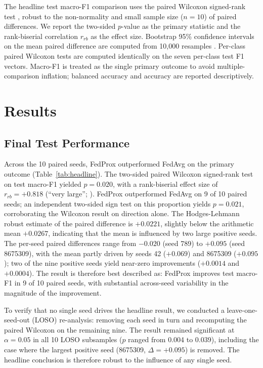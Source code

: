 \documentclass[11pt,a4paper]{article}
\begin{document}
The headline test macro-F1 comparison uses the paired Wilcoxon
signed-rank test \citep{demsar2006classifier}, robust to the non-normality and
small sample size ($n = 10$) of paired differences. We report the
two-sided $p$-value as the primary statistic and the rank-biserial
correlation $r_{rb}$ \citep{kerby2014rankbiserial} as the effect size. Bootstrap
95\% confidence intervals on the mean paired difference are computed
from 10{,}000 resamples \citep{efron1993bootstrap}. Per-class
paired Wilcoxon tests are computed identically on the seven per-class
test F1 vectors. Macro-F1 is treated as the single primary outcome to
avoid multiple-comparison inflation; balanced accuracy and accuracy are
reported descriptively.

\section{Results}

\subsection{Final Test Performance}
Across the 10 paired seeds, FedProx outperformed FedAvg on the primary
outcome (Table~\ref{tab:headline}). The two-sided paired Wilcoxon
signed-rank test on test macro-F1 yielded $p = 0.020$, with a
rank-biserial effect size of $r_{rb} = +0.818$ (``very large'';
\citealt{Kerby, 2014}). FedProx outperformed FedAvg on 9 of 10 paired
seeds; an independent two-sided sign test on this proportion yields
$p = 0.021$, corroborating the Wilcoxon result on direction alone. The
Hodges-Lehmann robust estimate of the paired difference is $+0.0221$,
slightly below the arithmetic mean $+0.0267$, indicating that the mean
is influenced by two large positive seeds. The per-seed paired
differences range from $-0.020$ (seed 789) to $+0.095$ (seed 8675309),
with the mean partly driven by seeds 42 ($+0.069$) and 8675309
($+0.095$); two of the nine positive seeds yield near-zero
improvements ($+0.0014$ and $+0.0004$). The result is therefore best
described as: FedProx improves test macro-F1 in 9 of 10 paired seeds,
with substantial across-seed variability in the magnitude of the
improvement.

To verify that no single seed drives the headline result, we conducted a
leave-one-seed-out (LOSO) re-analysis: removing each seed in turn and
recomputing the paired Wilcoxon on the remaining nine. The result
remained significant at $\alpha = 0.05$ in all 10 LOSO subsamples
($p$ ranged from 0.004 to 0.039), including the case where the
largest positive seed (8675309, $\Delta = +0.095$) is removed. The
headline conclusion is therefore robust to the influence of any single
seed.
\end{document}

